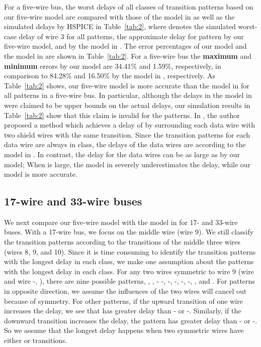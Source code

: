 \documentclass[10pt,journal]{IEEEtran}
\begin{document}
For a five-wire bus, the worst delays of all classes of transition patterns based on our five-wire model are compared with those of the model in \cite{Sot01} as well as the simulated delays by HSPICE in Table~\ref{tab:2}, where  denotes the simulated worst-case delay of wire 3 for all  patterns,  the approximate delay for  pattern by our five-wire model, and  by the model in \cite{Sot01}. The error percentages of our model and the model in \cite{Sot01} are shown in Table~\ref{tab:2}. For a five-wire bus the \textbf{maximum} and \textbf{minimum} errors by our model are 34.41\% and 1.59\%, respectively, in comparison to 84.28\% and 16.50\% by the model in \cite{Sot01}, respectively.
As Table~\ref{tab:2} shows, our five-wire model is more accurate than the model in \cite{Sot01} for all patterns in a five-wire bus. In particular, although the delays in the model in \cite{Sot01} were claimed to be upper bounds on the actual delays, our simulation results in Table~\ref{tab:2} show that this claim is invalid for the  patterns. In \cite{Dua04}, the author proposed a method which achieves a delay of  by surrounding each data wire with two shield wires with the same transition. Since the transition patterns for each data wire are always in  class, the delays of the data wires are  according to the model in \cite{Sot01}. In contrast, the delay for the data wires can be as large as  by our model; When  is large, the model in \cite{Sot01} severely underestimates the delay, while our model is more accurate.


\subsection{17-wire and 33-wire buses}
We next compare our five-wire model with the model in \cite{Sot01} for 17- and 33-wire buses. With a 17-wire bus, we focus on the middle wire (wire 9). We still classify the transition patterns according to the transitions of the middle three wires (wires 8, 9, and 10).
Since it is time consuming to identify the transition patterns with the longest delay in each class, we make one assumption about the patterns with the longest delay in each class. For any two wires symmetric to wire 9 (wire  and wire -, ), there are nine possible patterns, , , - -, -, -, -, -, , and . For patterns in opposite direction, we assume the influences of the two wires will cancel out because of symmetry. For other patterns, if the upward transition of one wire increases the delay, we see that  has greater delay than - or -. Similarly, if the downward transition increases the delay, the pattern  has greater delay than - or -. So we assume that the longest delay happens when two symmetric wires have either  or  transitions.
\end{document}

